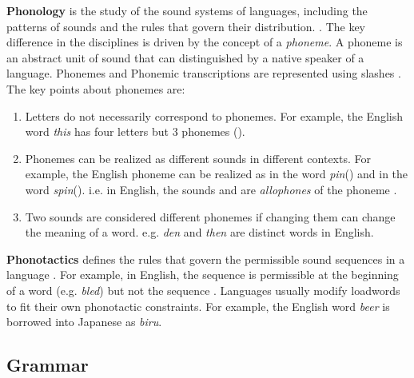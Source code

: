 \textbf{Phonology} is the study of the sound systems of languages, including the patterns of sounds and the rules that govern their distribution. \cite{trask2007language}.
The key difference in the disciplines is driven by the concept of a \textit{phoneme}. A phoneme is an abstract unit of sound that can distinguished
by a native speaker of a language. Phonemes and Phonemic transcriptions are represented using slashes \textipa{/ /}. The key points about phonemes are:
\begin{enumerate}
    \item Letters do not necessarily correspond to phonemes. For example, the English word \textit{this} has four letters but 3 phonemes ().
    \item Phonemes can be realized as different sounds in different contexts. For example, the English phoneme  can be realized as
    \textipa{[p\super{h}]} in the word \textit{pin}(\textipa{[p\super{h}In]}) and \textipa{[p]} in the word \textit{spin}(\textipa{[spIn]}).
    i.e. in English, the sounds \textipa{[p]} and \textipa{[p\super{h}]} are \textit{allophones} of the phoneme .
    \item Two sounds are considered different phonemes if changing them can change the meaning of a word. e.g. \textipa{[dEn]} \textit{den} and 
    \textipa{[DEn]} \textit{then} are distinct words in English.
\end{enumerate}


\textbf{Phonotactics} defines the rules that govern the permissible sound sequences in a language \cite{trask2007language}. For example, in English,
the sequence  is permissible at the beginning of a word (e.g. \textit{bled}) but not the sequence . Languages usually
modify loadwords to fit their own phonotactic constraints. For example, the English word \textit{beer} is borrowed into Japanese as \textit{biru}.


\subsection{Grammar}

